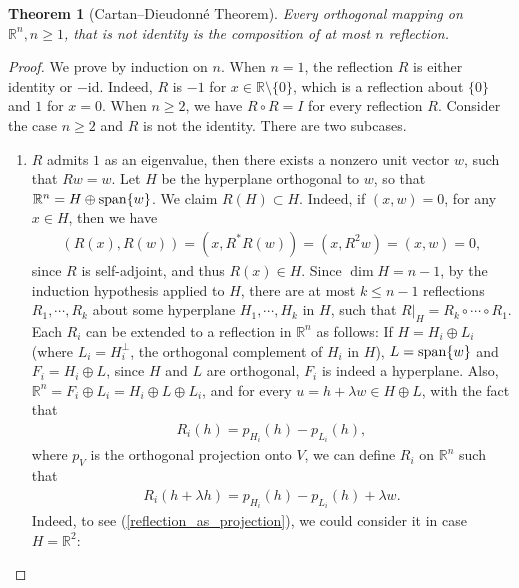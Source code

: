 \documentclass[10pt]{book}
\newtheorem{theorem}{Theorem}[chapter]
\theoremstyle{definition}
\numberwithin{equation}{chapter}
\begin{document}
\begin{subappendices}
\medskip

\begin{theorem}[Cartan–Dieudonné Theorem]{\rm \cite{35}} \label{Cartan_Dieudonne}
Every orthogonal mapping on $\mathbb{R}^n, n \geq 1$, that is not identity is the composition of at most $n$ reflection.
\end{theorem}
\begin{proof}
We prove by induction on $n$. When $n = 1$, the reflection $R$ is either identity or $-$id. Indeed, $R$ is $-1$ for $x \in \mathbb{R} \setminus \{0\}$, which is a reflection about $\{0\}$ and $1$ for $x = 0$. When $n \geq 2$, we have $R \circ R = I$ for every reflection $R$. Consider the case $n \geq 2$ and $R$ is not the identity. There are two subcases.
\begin{enumerate}[label=(\alph*)]
    \item $R$ admits $1$ as an eigenvalue, then there exists a nonzero unit vector $w$, such that $Rw = w$. Let $H$ be the hyperplane orthogonal to $w$, so that $\mathbb{R}^n = H \oplus {\rm span}\{w\}$. We claim $R(H) \subset H$. Indeed, if $(x, w) = 0$, for any $x \in H$, then we have 
    \begin{align*}
        (R(x), R(w)) = (x, R^* R(w)) = (x, R^2 w) = (x, w) = 0,
    \end{align*}
    since $R$ is self-adjoint, and thus $R(x) \in H$. Since $\dim H = n - 1$, by the induction hypothesis applied to $H$, there are at most $k \leq n - 1$ reflections $R_1, \cdots, R_k$ about some hyperplane $H_1, \cdots, H_k$ in $H$, such that $R|_H = R_k \circ \cdots \circ R_1$. Each $R_i$ can be extended to a reflection in $\mathbb{R}^n$ as follows: If $H = H_i \oplus L_i$ (where $L_i = H_i^\bot$, the orthogonal complement of $H_i$ in $H$), $L = {\rm span}\{w\}$ and $F_i = H_i \oplus L$, since $H$ and $L$ are orthogonal, $F_i$ is indeed a hyperplane. Also, $\mathbb{R}^n = F_i \oplus L_i = H_i \oplus L \oplus L_i$, and for every $u = h + \lambda w \in H \oplus L$, with the fact that
    \begin{align}\label{reflection_as_projection}
        R_i(h) = p_{H_i}(h) - p_{L_i}(h),
    \end{align}
    where $p_{V}$ is the orthogonal projection onto $V$, we can define $R_i$ on $\mathbb{R}^n$ such that 
    \begin{align*}
        R_i(h + \lambda h) = p_{H_i}(h) - p_{L_i}(h) + \lambda w.
    \end{align*}
    Indeed, to see (\ref{reflection_as_projection}), we could consider it in case $H = \mathbb{R}^2$:\\

\end{enumerate}
\end{proof}
\end{subappendices}
\end{document}
